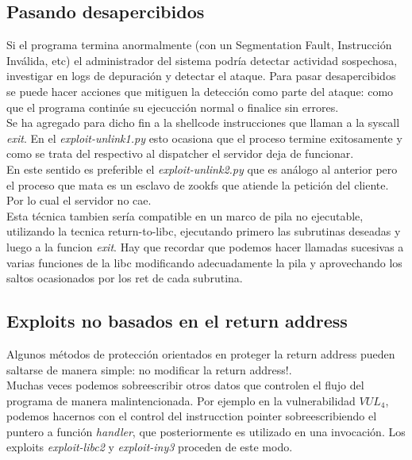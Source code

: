 \documentclass[12pt]{article}
\begin{document}
\subsection{Pasando desapercibidos}
Si el programa termina anormalmente (con un Segmentation Fault, Instrucción Inválida, etc) el administrador del sistema podría detectar actividad sospechosa, investigar en logs de depuración y detectar el ataque. Para pasar desapercibidos se puede hacer acciones que mitiguen la detección como parte del ataque: como que el programa continúe su ejecucción normal o finalice sin errores. \\

Se ha agregado para dicho fin a la shellcode instrucciones que llaman a la syscall  \textit{exit}. En el  \textit{exploit-unlink1.py} esto ocasiona que el proceso termine exitosamente y como se trata del respectivo al dispatcher el servidor deja de funcionar.\\
En este sentido es preferible el  \textit{exploit-unlink2.py} que es análogo al anterior pero el proceso que mata es un esclavo de zookfs que atiende la petición del cliente. Por lo cual el servidor no cae. \\

Esta técnica tambien sería compatible en un marco de pila no ejecutable, utilizando la tecnica return-to-libc, ejecutando primero las subrutinas deseadas y luego a la funcion \textit{exit}. Hay que recordar que podemos hacer llamadas sucesivas a varias funciones de la libc modificando adecuadamente la pila y aprovechando los saltos ocasionados por los ret de cada subrutina. \\

\subsection{Exploits no basados en el return address}
Algunos métodos de protección orientados en proteger la return address pueden saltarse de manera simple: no modificar la return address!. \\

Muchas veces podemos sobreescribir otros datos que controlen el flujo del programa de manera malintencionada. Por ejemplo en la vulnerabilidad $VUL_4$, podemos hacernos con el control del instrucction pointer sobreescribiendo el puntero a función \textit{handler}, que posteriormente es utilizado en una invocación. Los exploits \textit{exploit-libc2} y \textit{exploit-iny3} proceden de este modo. \\
\end{document}
